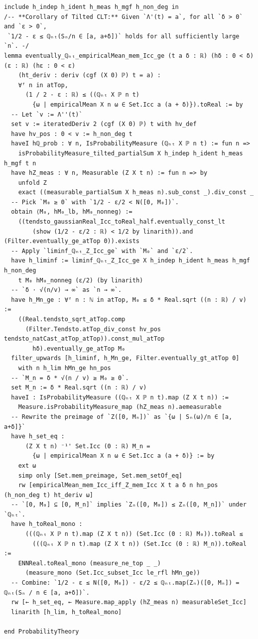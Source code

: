 \newpage
\begin{lstlisting}
include h_indep h_ident h_meas h_mgf h_non_deg in
/-- **Corollary of Tilted CLT:** Given `Λ'(t) = a`, for all `δ > 0` and `ε > 0`,
 `1/2 - ε ≤ ℚₙₜ(Sₙ/n ∈ [a, a+δ])` holds for all sufficiently large `n`. -/
lemma eventually_ℚₙₜ_empiricalMean_mem_Icc_ge (t a δ : ℝ) (hδ : 0 < δ) (ε : ℝ) (hε : 0 < ε)
    (ht_deriv : deriv (cgf (X 0) ℙ) t = a) :
    ∀ᶠ n in atTop,
      (1 / 2 - ε : ℝ) ≤ ((ℚₙₜ X ℙ n t)
        {ω | empiricalMean X n ω ∈ Set.Icc a (a + δ)}).toReal := by
  -- Let `v := Λ''(t)`
  set v := iteratedDeriv 2 (cgf (X 0) ℙ) t with hv_def
  have hv_pos : 0 < v := h_non_deg t
  haveI hℚ_prob : ∀ n, IsProbabilityMeasure (ℚₙₜ X ℙ n t) := fun n =>
    isProbabilityMeasure_tilted_partialSum X h_indep h_ident h_meas h_mgf t n
  have hZ_meas : ∀ n, Measurable (Z X t n) := fun n => by
    unfold Z
    exact ((measurable_partialSum X h_meas n).sub_const _).div_const _
  -- Pick `M₀ ≥ 0` with `1/2 - ε/2 < N([0, M₀])`.
  obtain ⟨M₀, hM₀_lb, hM₀_nonneg⟩ :=
    ((tendsto_gaussianReal_Icc_toReal_half.eventually_const_lt
        (show (1/2 - ε/2 : ℝ) < 1/2 by linarith)).and (Filter.eventually_ge_atTop 0)).exists
  -- Apply `liminf_ℚₙₜ_Z_Icc_ge` with `M₀` and `ε/2`.
  have h_liminf := liminf_ℚₙₜ_Z_Icc_ge X h_indep h_ident h_meas h_mgf h_non_deg
    t M₀ hM₀_nonneg (ε/2) (by linarith)
  -- `δ · √(n/v) → ∞` as `n → ∞`.
  have h_Mn_ge : ∀ᶠ n : ℕ in atTop, M₀ ≤ δ * Real.sqrt ((n : ℝ) / v) :=
    ((Real.tendsto_sqrt_atTop.comp
      (Filter.Tendsto.atTop_div_const hv_pos tendsto_natCast_atTop_atTop)).const_mul_atTop
        hδ).eventually_ge_atTop M₀
  filter_upwards [h_liminf, h_Mn_ge, Filter.eventually_gt_atTop 0]
    with n h_lim hMn_ge hn_pos
  -- `M_n = δ * √(n / v) ≥ M₀ ≥ 0`.
  set M_n := δ * Real.sqrt ((n : ℝ) / v)
  haveI : IsProbabilityMeasure ((ℚₙₜ X ℙ n t).map (Z X t n)) :=
    Measure.isProbabilityMeasure_map (hZ_meas n).aemeasurable
  -- Rewrite the preimage of `Z([0, Mₙ])` as `{ω | Sₙ(ω)/n ∈ [a, a+δ]}`
  have h_set_eq :
      (Z X t n) ⁻¹' Set.Icc (0 : ℝ) M_n =
        {ω | empiricalMean X n ω ∈ Set.Icc a (a + δ)} := by
    ext ω
    simp only [Set.mem_preimage, Set.mem_setOf_eq]
    rw [empiricalMean_mem_Icc_iff_Z_mem_Icc X t a δ n hn_pos (h_non_deg t) ht_deriv ω]
  -- `[0, M₀] ⊆ [0, M_n]` implies `Zₙ([0, M₀]) ≤ Zₙ([0, M_n])` under `ℚₙₜ`.
  have h_toReal_mono :
      (((ℚₙₜ X ℙ n t).map (Z X t n)) (Set.Icc (0 : ℝ) M₀)).toReal ≤
        (((ℚₙₜ X ℙ n t).map (Z X t n)) (Set.Icc (0 : ℝ) M_n)).toReal :=
    ENNReal.toReal_mono (measure_ne_top _ _)
      (measure_mono (Set.Icc_subset_Icc le_rfl hMn_ge))
  -- Combine: `1/2 - ε ≤ N([0, M₀]) - ε/2 ≤ ℚₙₜ.map(Zₙ)([0, Mₙ]) = ℚₙₜ(Sₙ / n ∈ [a, a+δ])`.
  rw [← h_set_eq, ← Measure.map_apply (hZ_meas n) measurableSet_Icc]
  linarith [h_lim, h_toReal_mono]

end ProbabilityTheory
\end{lstlisting}

